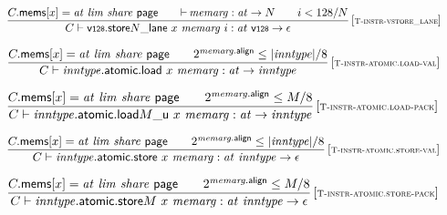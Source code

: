 $$
\begin{array}{@{}c@{}}\displaystyle
\frac{
C{.}\mathsf{mems}{}[x] = {\mathit{at}}~{\mathit{lim}}~{\mathit{share}}~\mathsf{page}
 \qquad
{\vdash}\, {\mathit{memarg}} : {\mathit{at}} \rightarrow N
 \qquad
i < 128 / N
}{
C \vdash {\mathsf{v{\scriptstyle 128}}{.}\mathsf{store}}{N}{\mathsf{\_}}{\mathsf{lane}}~x~{\mathit{memarg}}~i : {\mathit{at}}~\mathsf{v{\scriptstyle 128}} \rightarrow \epsilon
} \, {[\textsc{\scriptsize T{-}instr{-}vstore\_lane}]}
\qquad
\end{array}
$$

\vspace{1ex}

$$
\begin{array}{@{}c@{}}\displaystyle
\frac{
C{.}\mathsf{mems}{}[x] = {\mathit{at}}~{\mathit{lim}}~{\mathit{share}}~\mathsf{page}
 \qquad
{2^{{\mathit{memarg}}{.}\mathsf{align}}} \leq {|{\mathit{inntype}}|} / 8
}{
C \vdash {\mathit{inntype}}{.}\mathsf{atomic}{.}\mathsf{load}~x~{\mathit{memarg}} : {\mathit{at}} \rightarrow {\mathit{inntype}}
} \, {[\textsc{\scriptsize T{-}instr{-}atomic.load{-}val}]}
\qquad
\end{array}
$$

$$
\begin{array}{@{}c@{}}\displaystyle
\frac{
C{.}\mathsf{mems}{}[x] = {\mathit{at}}~{\mathit{lim}}~{\mathit{share}}~\mathsf{page}
 \qquad
{2^{{\mathit{memarg}}{.}\mathsf{align}}} \leq M / 8
}{
C \vdash {{\mathit{inntype}}{.}\mathsf{atomic}{.}\mathsf{load}}{{M}{\mathsf{\_}}{\mathsf{u}}}~x~{\mathit{memarg}} : {\mathit{at}} \rightarrow {\mathit{inntype}}
} \, {[\textsc{\scriptsize T{-}instr{-}atomic.load{-}pack}]}
\qquad
\end{array}
$$

$$
\begin{array}{@{}c@{}}\displaystyle
\frac{
C{.}\mathsf{mems}{}[x] = {\mathit{at}}~{\mathit{lim}}~{\mathit{share}}~\mathsf{page}
 \qquad
{2^{{\mathit{memarg}}{.}\mathsf{align}}} \leq {|{\mathit{inntype}}|} / 8
}{
C \vdash {\mathit{inntype}}{.}\mathsf{atomic}{.}\mathsf{store}~x~{\mathit{memarg}} : {\mathit{at}}~{\mathit{inntype}} \rightarrow \epsilon
} \, {[\textsc{\scriptsize T{-}instr{-}atomic.store{-}val}]}
\qquad
\end{array}
$$

$$
\begin{array}{@{}c@{}}\displaystyle
\frac{
C{.}\mathsf{mems}{}[x] = {\mathit{at}}~{\mathit{lim}}~{\mathit{share}}~\mathsf{page}
 \qquad
{2^{{\mathit{memarg}}{.}\mathsf{align}}} \leq M / 8
}{
C \vdash {{\mathit{inntype}}{.}\mathsf{atomic}{.}\mathsf{store}}{M}~x~{\mathit{memarg}} : {\mathit{at}}~{\mathit{inntype}} \rightarrow \epsilon
} \, {[\textsc{\scriptsize T{-}instr{-}atomic.store{-}pack}]}
\qquad
\end{array}
$$

